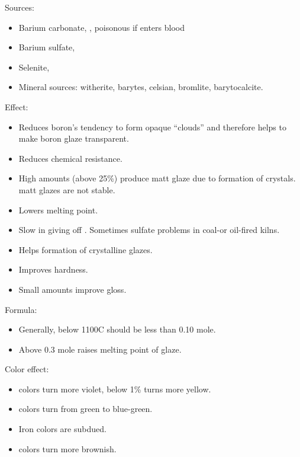 Sources:
\begin{itemize}
  \item Barium carbonate, , poisonous if enters blood
  \item Barium sulfate, 
  \item Selenite, 
  \item Mineral sources: witherite, barytes, celsian, bromlite, barytocalcite.
\end{itemize}
Effect:
\begin{itemize}
\item Reduces boron's tendency to form opaque ``clouds'' and therefore helps to 
make boron glaze transparent.
\item Reduces chemical resistance.
\item High amounts (above 25\%) produce matt glaze due to formation of 
crystals.  matt glazes are not stable.
\item Lowers melting point.
\item Slow in giving off . Sometimes sulfate problems in coal-or 
oil-fired kilns.
\item Helps formation of crystalline glazes.
\item Improves hardness.
\item Small amounts improve gloss.
\end{itemize}
Formula:
\begin{itemize}
  \item Generally, below 1100\degree C  should be less than 0.10 mole.
\item Above 0.3 mole  raises melting point of glaze.
\end{itemize}
Color effect:
\begin{itemize}
\item {} colors turn more violet,  below 1\% turns more yellow.
\item {} colors turn from green to blue-green.
\item Iron colors are subdued.
\item {} colors turn more brownish.
\end{itemize}
